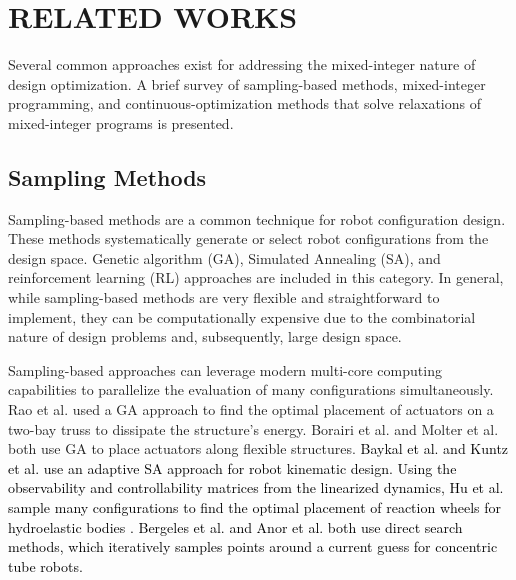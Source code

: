 \documentclass[runningheads]{llncs}
\newcommand{\changes}[1]{\textcolor{black}{#1}}
\begin{document}
\section{RELATED WORKS} \label{sec:related_works}
Several common approaches exist for addressing the mixed-integer nature of design optimization. A brief survey of sampling-based methods, mixed-integer programming, and continuous-optimization methods that solve relaxations of mixed-integer programs is presented.
\vspace{-15pt}
\subsection{Sampling Methods}
Sampling-based methods are a common technique for robot configuration design. These methods systematically generate or select robot configurations from the design space. Genetic algorithm (GA), Simulated Annealing (SA), and reinforcement learning (RL) approaches are included in this category. In general, while sampling-based methods are very flexible and straightforward to implement, they can be computationally expensive due to the combinatorial nature of design problems and, subsequently, large design space. 

Sampling-based approaches can leverage modern multi-core computing capabilities to parallelize the evaluation of many configurations simultaneously. Rao et al. \cite{Rao1991} used a GA approach to find the optimal placement of actuators on a two-bay truss to dissipate the structure's energy. Borairi et al. \cite{m_borairi_optimal_2017} and Molter et al. \cite{molter_simultaneous_2010} both use GA to place actuators along flexible structures. \changes{Baykal et al. \cite{baykal_asymptotically_2019} and Kuntz et al. \cite{a_kuntz_kinematic_2018} use an adaptive SA approach for robot kinematic design. Using the observability and controllability matrices from the linearized dynamics, Hu et al. sample many configurations to find the optimal placement of reaction wheels for hydroelastic bodies \cite{hu_placement_2015}. Bergeles et al. \cite{c_bergeles_concentric_2015} and Anor et al. \cite{t_anor_algorithms_2011} both use direct search methods, which iteratively samples points around a current guess for concentric tube robots. }
\end{document}
